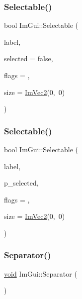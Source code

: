 \mbox{\label{namespaceImGui_af98575238bda183a523df19fb447af60}} 
\subsubsection{\texorpdfstring{Selectable()}{Selectable()}\hspace{0.1cm}{\footnotesize\ttfamily [1/2]}}
{\footnotesize\ttfamily bool Im\+Gui\+::\+Selectable (\begin{DoxyParamCaption}\item[{const char $\ast$}]{label,  }\item[{bool}]{selected = {\ttfamily false},  }\item[{Im\+Gui\+Selectable\+Flags}]{flags = {},  }\item[{const \hyperlink{structImVec2}{Im\+Vec2} \&}]{size = {\ttfamily \hyperlink{structImVec2}{Im\+Vec2}(0,~0)} }\end{DoxyParamCaption})}

\mbox{\label{namespaceImGui_a9229a9c3c304ffc0c98ffe2ee4ff5e40}} 
\subsubsection{\texorpdfstring{Selectable()}{Selectable()}\hspace{0.1cm}{\footnotesize\ttfamily [2/2]}}
{\footnotesize\ttfamily bool Im\+Gui\+::\+Selectable (\begin{DoxyParamCaption}\item[{const char $\ast$}]{label,  }\item[{bool $\ast$}]{p\+\_\+selected,  }\item[{Im\+Gui\+Selectable\+Flags}]{flags = {},  }\item[{const \hyperlink{structImVec2}{Im\+Vec2} \&}]{size = {\ttfamily \hyperlink{structImVec2}{Im\+Vec2}(0,~0)} }\end{DoxyParamCaption})}

\mbox{\label{namespaceImGui_a191123597a5084d003c8beac7eeb029e}} 
\subsubsection{\texorpdfstring{Separator()}{Separator()}}
{\footnotesize\ttfamily \hyperlink{imgui__impl__opengl3__loader_8h_ac668e7cffd9e2e9cfee428b9b2f34fa7}{void} Im\+Gui\+::\+Separator (\begin{DoxyParamCaption}{ }\end{DoxyParamCaption})}

